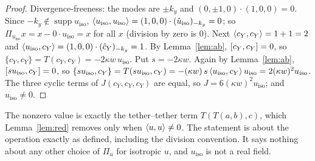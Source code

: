 \documentclass[11pt]{article}\emergencystretch=2em
\theoremstyle{definition}\newtheorem{definition}[theorem]{Definition}\theoremstyle{remark}\newtheorem{remark}[theorem]{Remark}
\begin{document}
\begin{proof}
Divergence-freeness: the modes are $\pm k_y$ and $(0,\pm1,0)\cdot(1,0,0)=0$. Since $-k_y\notin\operatorname{supp}u_{\mathrm{iso}}$, $\langle u_{\mathrm{iso}},u_{\mathrm{iso}}\rangle=(1,0,0)\cdot(\hat u_{\mathrm{iso}})_{-k_y}=0$; so $\Pi_{u_{\mathrm{iso}}}x=x-0\cdot u_{\mathrm{iso}}=x$ for all $x$ (division by zero is $0$). Next $\langle c_Y,c_Y\rangle=1+1=2$ and $\langle u_{\mathrm{iso}},c_Y\rangle=(1,0,0)\cdot(\hat c_Y)_{-k_y}=1$. By Lemma~\ref{lem:ab}, $[c_Y,c_Y]=0$, so $\{c_Y,c_Y\}=T(c_Y,c_Y)=-2\kappa w\,u_{\mathrm{iso}}$. Put $s=-2\kappa w$. Again by Lemma~\ref{lem:ab}, $[s u_{\mathrm{iso}},c_Y]=0$, so $\{s u_{\mathrm{iso}},c_Y\}=T(su_{\mathrm{iso}},c_Y)=-(\kappa w)\,s\,\langle u_{\mathrm{iso}},c_Y\rangle\,u_{\mathrm{iso}}=2(\kappa w)^2u_{\mathrm{iso}}$. The three cyclic terms of $J(c_Y,c_Y,c_Y)$ are equal, so $J=6(\kappa w)^2u_{\mathrm{iso}}$; and $u_{\mathrm{iso}}\ne0$.
\end{proof}
The nonzero value is exactly the tether--tether term $T(T(a,b),c)$, which Lemma~\ref{lem:red} removes only when $\langle u,u\rangle\ne0$. The statement is about the operation exactly as defined, including the division convention. It says nothing about any other choice of $\Pi_u$ for isotropic $u$, and $u_{\mathrm{iso}}$ is not a real field.
\end{document}
